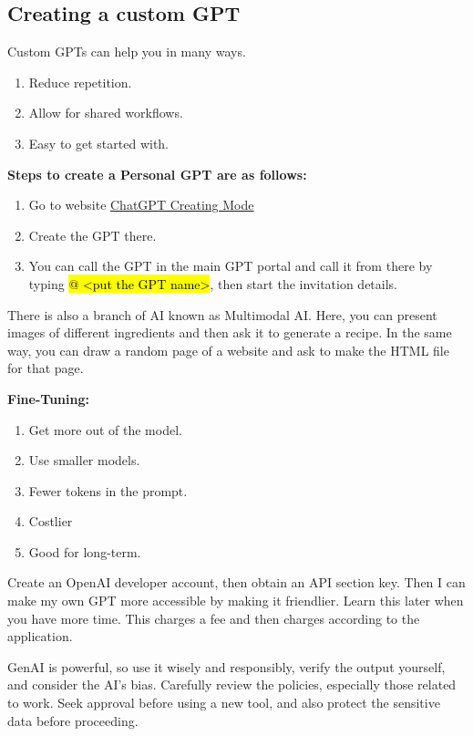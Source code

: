 \subsection{Creating a custom GPT}
Custom GPTs can help you in many ways.
\begin{enumerate}
    \item Reduce repetition.
    \item Allow for shared workflows.
    \item Easy to get started with.
\end{enumerate}
\vspace{1.0cm}
\textbf{Steps to create a Personal GPT are as follows:}
\begin{enumerate}[\ding{212}]
    \item Go to website \href{https://chat.openai.com/create}{ChatGPT Creating Mode}
    \item Create the GPT there.
    \item You can call the GPT in the main GPT portal and call it from there by typing \hl{@ <put the GPT name>}, then start the invitation details.
\end{enumerate}
\hspace{0.5cm}There is also a branch of AI known as Multimodal AI. Here, you can present images of different ingredients and then ask it to generate a recipe. In the same way, you can draw a random page of a website and ask to make the HTML file for that page.

\textbf{Fine-Tuning:}
\begin{enumerate}[\ding{212}]
    \item Get more out of the model.
    \item Use smaller models.
    \item Fewer tokens in the prompt.
    \item Costlier
    \item Good for long-term.
\end{enumerate}

Create an OpenAI developer account, then obtain an API section key. Then I can make my own GPT more accessible by making it friendlier. Learn this later when you have more time. This charges a fee and then charges according to the application.

GenAI is powerful, so use it wisely and responsibly, verify the output yourself, and consider the AI's bias. Carefully review the policies, especially those related to work. Seek approval before using a new tool, and also protect the sensitive data before proceeding.

\stardivider